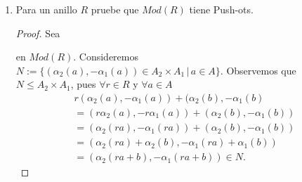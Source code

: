 \documentclass{article}
\begin{document}
\begin{enumerate}[label=\textbf{Ej \arabic*.}]
\begin{proof}
\begin{align*}
			\end{align*}
			Notemos que $\gamma$ es un morfismo de $R$-módulos, puesto que $\beta_1$ y $\beta_2$ lo son, y que si $p\in P$ entonces
			\begin{align*}
				\pi_1\gamma\lrprth{p}&=\pi_1\lrprth{\beta_1\lrprth{p},\beta_2\lrprth{p}}=\beta_1\lrprth{p}\\
				\implies \pi_1\gamma&=\beta_1.
			\end{align*}
			Análogamente se verifica que $\pi_2\gamma=\beta_2$, con lo cual el siguiente diagrama conmuta
			\begin{equation*}
				\commutativesquare{up=t,A=\copyandpaste,B=A_2,C=A_1,D=A,f=\pi_2,g=\pi_1,h=\alpha_2,k=\alpha_1,l=\beta_2,m=\beta_1,n=\gamma,}
			\end{equation*}
			Finalmente, si $\catarrow{\gamma'}{P}{\copyandpaste}{}$ es un morfismo de $R$-módulos tal que $\pi_1\gamma'=\beta_1$ y $\pi_2\gamma'=\beta_2$ y $p\in P$, entonces
			\begin{align*}
				\pi_1\gamma'\lrprth{p}&=\beta_1\lrprth{p},\\
				\pi_2\gamma'\lrprth{p}&=\beta_2\lrprth{p},
			\end{align*}
			con lo cual $\gamma'\lrprth{p}=\lrprth{\pi_1\lrprth{\gamma'\lrprth{p}},\pi_2\lrprth{\gamma'\lrprth{p}}}=\lrprth{\beta_1\lrprth{p},\beta_2\lrprth{p}}=\gamma\lrprth{p}$ y por lo tanto $\gamma'=\gamma$.\\
		\end{proof}
\item Para un anillo $R$ pruebe que $Mod(R)$ tiene Push-ots.
\begin{proof}
Sea  en $Mod(R)$. Consideremos \\
$N:=\{(\alpha_2(a),-\alpha_1(a))\in A_2\times A_1\,|\,a\in A\}$. Observemos que $N\leq A_2\times A_1$, pues $\forall r\in R$ y $\forall a\in A$
\begin{gather*}
r(\alpha_2(a),-\alpha_1(a))+(\alpha_2(b),-\alpha_1(b)\\
=(r\alpha_2(a),-r\alpha_1(a))+(\alpha_2(b),-\alpha_1(b))\\
=(\alpha_2(ra),-\alpha_1(ra))+(\alpha_2(b),-\alpha_1(b))\\
=(\alpha_2(ra)+\alpha_2(b),-\alpha_1(ra)+\alpha_1(b))\\
=(\alpha_2(ra+b),-\alpha_1(ra+b))\in N.
\end{gather*}


\end{proof}
\end{enumerate}
\end{document}
